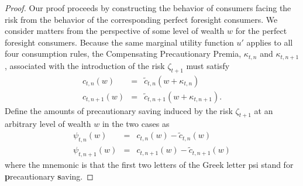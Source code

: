 \documentclass[titlepage]{\econtex}
\providecommand{\wAlt}{\omega}
\newtheorem{lemma}{Lemma}
\begin{document}
  \begin{proof}


    Our proof proceeds by constructing the behavior of consumers facing the risk from the behavior of the corresponding perfect foresight consumers.  We consider matters from the perspective of some level of wealth ${w}$ for the perfect foresight consumers.  Because the same marginal utility function $u'$ applies to all four consumption rules, the Compensating Precautionary Premia, $\kappa_{t,n}$ and $\kappa_{t,n+1}$, associated with the introduction of the risk $\zeta_{t+1}$  must satisfy
    \begin{eqnarray}
      c_{t,n}({w}) & = & \tilde{c}_{t,n}({w}+\kappa_{t,n}) \label{eq:hateqtildehat2}
      \\ c_{t,n+1}({w}) & = & \tilde{c}_{t,n+1}({w}+\kappa_{t,n+1}). \label{eq:hateqtildehat}\end{eqnarray}
    Define the amounts of precautionary saving induced by the risk $\zeta_{t+1}$ at an arbitrary level of wealth $w$ in the two cases as
    \begin{eqnarray}
      \psi_{t,n}(w) & = & c_{t,n}(w)-\tilde{c}_{t,n}(w)
      \\   \psi_{t,n+1}(w) & = & c_{t,n+1}(w)-\tilde{c}_{t,n+1}(w)
    \end{eqnarray}
    where the mnemonic is that the first two letters of the Greek letter psi stand
    for {\bf p}recautionary {\bf s}aving.


\end{proof}
\end{document}
